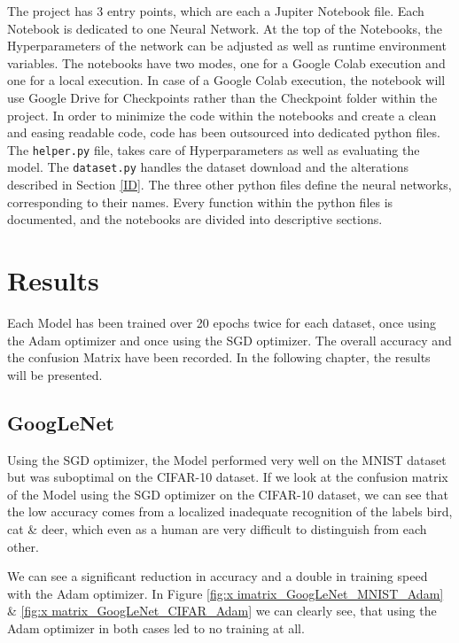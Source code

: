 \documentclass[conference]{IEEEtran}
\begin{document}
The project has 3 entry points, which are each a Jupiter Notebook file. Each Notebook is dedicated to one Neural Network.
At the top of the Notebooks, the Hyperparameters of the network can be adjusted as well as runtime environment variables.
The notebooks have two modes, one for a Google Colab execution and one for a local execution.
In case of a Google Colab execution, the notebook will use Google Drive for Checkpoints rather than the Checkpoint folder within the project.
In order to minimize the code within the notebooks and create a clean and easing readable code, code has been outsourced into dedicated python files.
The \verb|helper.py| file, takes care of Hyperparameters as well as evaluating the model. The \verb|dataset.py| handles the dataset download and the alterations described in Section \ref{ID}.
The three other python files define the neural networks, corresponding to their names. Every function within the python files is documented, and the notebooks are divided into descriptive sections.


\section{Results}\label{C4}
Each Model has been trained over 20 epochs twice for each dataset, once using the Adam optimizer and once using the SGD optimizer. 
The overall accuracy and the confusion Matrix have been recorded. In the following chapter, the results will be presented.

\subsection{GoogLeNet}

Using the SGD optimizer, the Model performed very well on the MNIST dataset but was suboptimal on the CIFAR-10 dataset. 
If we look at the confusion matrix of the Model using the SGD optimizer on the CIFAR-10 dataset, we can see that the low accuracy comes from a localized inadequate recognition of the labels bird, cat \& deer, which even as a human are very difficult to distinguish from each other.

We can see a significant reduction in accuracy and a double in training speed with the Adam optimizer.
In Figure \ref{fig:x imatrix_GoogLeNet_MNIST_Adam} \& \ref{fig:x matrix_GoogLeNet_CIFAR_Adam} we can clearly see, that using the Adam optimizer in both cases led to no training at all.
\end{document}
